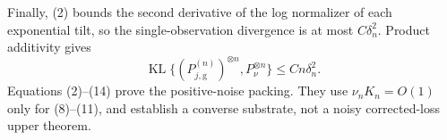 Finally, (2) bounds the second derivative of the log normalizer of each exponential tilt, so the single-observation divergence is at most \(C\delta_n^2\).  Product additivity gives
\[
 \operatorname{KL}\{(P_{j,\mathrm g}^{(n)})^{\otimes n},P_\nu^{\otimes n}\}
 \leq Cn\delta_n^2.                                                                     \tag{14}
\]
Equations (2)--(14) prove the positive-noise packing.  They use \(\nu_nK_n=O(1)\) only for (8)--(11), and establish a converse substrate, not a noisy corrected-loss upper theorem.